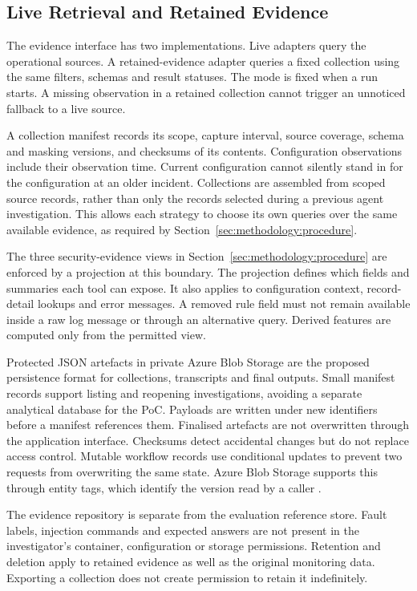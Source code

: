 \subsection{Live Retrieval and Retained Evidence}

The evidence interface has two implementations. Live adapters query the
operational sources. A retained-evidence adapter queries a fixed collection
using the same filters, schemas and result statuses. The mode is fixed
when a run starts. A missing observation in a retained collection cannot
trigger an unnoticed fallback to a live source.

A collection manifest records its scope, capture interval, source
coverage, schema and masking versions, and checksums of its contents.
Configuration observations include their observation time. Current
configuration cannot silently stand in for the configuration at an older
incident. Collections are assembled from scoped source records, rather
than only the records selected during a previous agent investigation.
This allows each strategy to choose its own queries over the same
available evidence, as required by
Section~\ref{sec:methodology:procedure}.

The three security-evidence views in
Section~\ref{sec:methodology:procedure} are enforced by a projection at
this boundary. The projection defines which fields and summaries each
tool can expose. It also applies to configuration context, record-detail
lookups and error messages. A removed rule field must not remain available
inside a raw log message or through an alternative query. Derived features
are computed only from the permitted view.

Protected JSON artefacts in private Azure Blob Storage are the proposed
persistence format for collections, transcripts and final outputs.
Small manifest records support listing and reopening investigations,
avoiding a separate analytical database for the PoC. Payloads are written
under new identifiers before a manifest references them. Finalised
artefacts are not overwritten through the application interface.
Checksums detect accidental changes but do not replace access control.
Mutable workflow records use conditional updates to prevent two
requests from overwriting the same state. Azure Blob Storage supports
this through entity tags, which identify the version read by a caller
\parencite{microsoft2026blobconcurrency}.

The evidence repository is separate from the evaluation reference store.
Fault labels, injection commands and expected answers are not present in
the investigator's container, configuration or storage permissions.
Retention and deletion apply to retained evidence as well as the original
monitoring data. Exporting a collection does not create permission to
retain it indefinitely.

